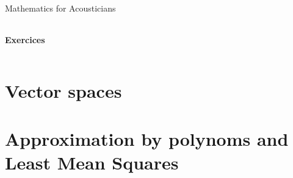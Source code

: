 \documentclass[10pt,a4paper]{report}
\begin{document}
\begin{center}
{\Large Mathematics for Acousticians}
 \begin{tabularx}{\linewidth}{c}
\hline
\end{tabularx}
\end{center}
\begin{center}
 {\Large \textbf{Exercices}\\}
\end{center}
 \begin{tabularx}{\linewidth}{c}
\hline
\end{tabularx}
\setcounter{chapter}{1}




\section{Vector spaces}












\section{Approximation by polynoms and Least Mean Squares}







\end{document}
